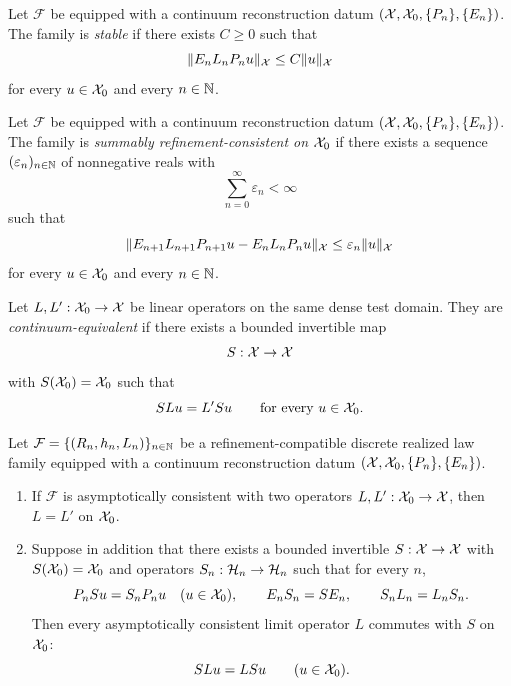 \begin{definition}
\label{def:stable-discrete-family}
Let $\mathcal F$ be equipped with a continuum reconstruction datum
$(\mathcal{X},\mathcal{X}_0,\{P_n\},\{E_n\})$. The family is \emph{stable} if there exists
$C\ge 0$ such that
\[
\|E_nL_nP_nu\|_{\mathcal{X}}\le C\|u\|_{\mathcal{X}}
\]
for every $u\in\mathcal{X}_0$ and every $n\in\mathbb{N}$.
\end{definition}

\begin{definition}
\label{def:summable-refinement-consistency}
Let $\mathcal F$ be equipped with a continuum reconstruction datum
$(\mathcal{X},\mathcal{X}_0,\{P_n\},\{E_n\})$. The family is
\emph{summably refinement-consistent on $\mathcal{X}_0$} if there exists a sequence
$(\varepsilon_n)_{n\in\mathbb{N}}$ of nonnegative reals with
\[
\sum_{n=0}^{\infty}\varepsilon_n<\infty
\]
such that
\[
\|E_{n+1}L_{n+1}P_{n+1}u-E_nL_nP_nu\|_{\mathcal{X}}
\le
\varepsilon_n\|u\|_{\mathcal{X}}
\]
for every $u\in\mathcal{X}_0$ and every $n\in\mathbb{N}$.
\end{definition}

\begin{definition}
\label{def:continuum-equivalence}
Let $L,L':\mathcal{X}_0\to\mathcal{X}$ be linear operators on the same dense test domain.
They are \emph{continuum-equivalent} if there exists a bounded invertible map
\[
S:\mathcal{X}\to \mathcal{X}
\]
with $S(\mathcal{X}_0)=\mathcal{X}_0$ such that
\[
SLu=L'Su
\qquad\text{for every }u\in\mathcal{X}_0.
\]
\end{definition}

\begin{theorem}
\label{thm:continuum-identification}
Let $\mathcal F=\{(R_n,h_n,L_n)\}_{n\in\mathbb{N}}$ be a refinement-compatible
discrete realized law family equipped with a continuum reconstruction datum
$(\mathcal{X},\mathcal{X}_0,\{P_n\},\{E_n\})$.
\begin{enumerate}[label=(\roman*), leftmargin=2em, itemsep=0.2em]
\item If $\mathcal F$ is asymptotically consistent with two operators
      $L,L':\mathcal{X}_0\to\mathcal{X}$, then $L=L'$ on $\mathcal{X}_0$.
\item Suppose in addition that there exists a bounded invertible
      $S:\mathcal{X}\to\mathcal{X}$ with $S(\mathcal{X}_0)=\mathcal{X}_0$ and operators
      $S_n:\mathcal{H}_n\to\mathcal{H}_n$ such that for every $n$,
      \[
      P_nSu=S_nP_nu \quad (u\in\mathcal{X}_0),
      \qquad
      E_nS_n=SE_n,
      \qquad
      S_nL_n=L_nS_n.
      \]
      Then every asymptotically consistent limit operator $L$ commutes with $S$
      on $\mathcal{X}_0$:
      \[
      SLu=LSu
      \qquad (u\in\mathcal{X}_0).
      \]
\end{enumerate}
\end{theorem}

